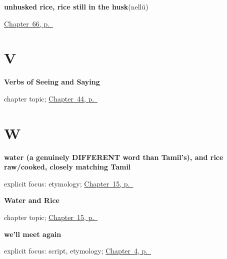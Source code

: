 \noindent\begin{minipage}[t]{\linewidth}
\raggedright
\textbf{unhusked rice, rice still in the husk}\enspace\emph{}\enspace(nellŭ)\par
\footnotesize \hyperref[ch:ml-out-in-the-paddy]{Chapter~66, p.~\pageref*{ch:ml-out-in-the-paddy}}
\end{minipage}\par\smallskip

\section*{V}

\noindent\begin{minipage}[t]{\linewidth}
\raggedright
\textbf{Verbs of Seeing and Saying}\par
\footnotesize chapter topic; \hyperref[ch:ml-see-say]{Chapter~44, p.~\pageref*{ch:ml-see-say}}
\end{minipage}\par\smallskip

\section*{W}

\noindent\begin{minipage}[t]{\linewidth}
\raggedright
\textbf{water (a genuinely DIFFERENT word than Tamil's), and rice raw/cooked, closely matching Tamil}\enspace\emph{  }\par
\footnotesize explicit focus: etymology; \hyperref[ch:ml-water-and-rice]{Chapter~15, p.~\pageref*{ch:ml-water-and-rice}}
\end{minipage}\par\smallskip

\noindent\begin{minipage}[t]{\linewidth}
\raggedright
\textbf{Water and Rice}\par
\footnotesize chapter topic; \hyperref[ch:ml-water-and-rice]{Chapter~15, p.~\pageref*{ch:ml-water-and-rice}}
\end{minipage}\par\smallskip

\noindent\begin{minipage}[t]{\linewidth}
\raggedright
\textbf{we'll meet again}\enspace\emph{ }\par
\footnotesize explicit focus: script, etymology; \hyperref[ch:farewells]{Chapter~4, p.~\pageref*{ch:farewells}}
\end{minipage}\par\smallskip

